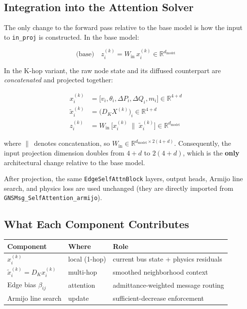 \documentclass{article}
\begin{document}
\subsection{Integration into the Attention Solver}

The only change to the forward pass relative to the base model is how the
input to \texttt{in\_proj} is constructed.  In the base model:

\begin{equation}
  \text{(base)}\quad
  z_i^{(k)} = W_{\mathrm{in}}\, x_i^{(k)}
  \in \mathbb{R}^{d_{\mathrm{model}}}
\end{equation}

In the K-hop variant, the raw node state and its diffused counterpart are
\emph{concatenated} and projected together:

\begin{align}
  x_i^{(k)} &= \bigl[v_i, \theta_i, \Delta P_i, \Delta Q_i, m_i\bigr]
  \in \mathbb{R}^{4+d}
  \label{eq:nodestate}\\
  \tilde{x}_i^{(k)} &= \bigl(D_K X^{(k)}\bigr)_i
  \in \mathbb{R}^{4+d}
  \label{eq:diffused}\\
  z_i^{(k)} &= W_{\mathrm{in}}\,
  \bigl[x_i^{(k)} \;\|\; \tilde{x}_i^{(k)}\bigr]
  \in \mathbb{R}^{d_{\mathrm{model}}}
  \label{eq:proj}
\end{align}

where $\|\,$ denotes concatenation, so $W_{\mathrm{in}} \in
\mathbb{R}^{d_{\mathrm{model}} \times 2(4+d)}$.
Consequently, the input projection dimension doubles from $4+d$ to
$2(4+d)$, which is the \textbf{only} architectural change relative to the
base model.

After projection, the same \texttt{EdgeSelfAttnBlock} layers, output heads,
Armijo line search, and physics loss are used unchanged (they are directly
imported from \texttt{GNSMsg\_SelfAttention\_armijo}).

\subsection{What Each Component Contributes}

\begin{center}
\begin{tabular}{lll}
\toprule
Component & Where & Role \\
\midrule
$x_i^{(k)}$ & local (1-hop) & current bus state + physics residuals \\
$\tilde{x}_i^{(k)} = D_K x_i^{(k)}$ & multi-hop & smoothed neighborhood context \\
Edge bias $\beta_{ij}$ & attention & admittance-weighted message routing \\
Armijo line search & update & sufficient-decrease enforcement \\
\bottomrule
\end{tabular}
\end{center}
\end{document}
